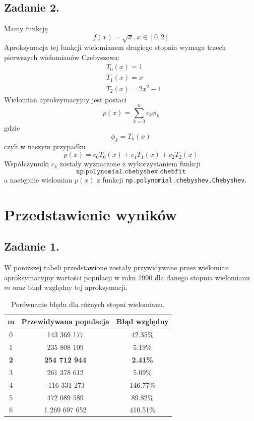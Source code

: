\documentclass[11pt]{scrartcl}
\begin{document}
    \subsection{Zadanie 2.}
    Mamy funkcję
    \[
        f(x)=\sqrt{x},x \in [0,2]
    \]
    Aproksymacja tej funkcji wielomianem drugiego stopnia
    wymaga trzech pierwszych wielomianów Czebyszewa:
    \begin{align*}
        & T_0(x) = 1 \\
        & T_1(x) = x \\
        & T_2(x) = 2x^2-1
    \end{align*}
    Wielomian aproksymacyjny jest postaci
    \[
        p(x)=\sum_{k=0}^{n}c_k\phi_k
    \]
    gdzie
    \[
        \phi_k=T_k(x)
    \]
    czyli w naszym przypadku
    \[
        p(x)=c_0T_0(x)+c_1T_1(x)+c_2T_2(x)
    \]
    Współczynniki $c_k$ zostały wyznaczone z wykorzystaniem funkcji
    \[
        \texttt{np.polynomial.chebyshev.chebfit}
    \]
    a następnie wielomian $p(x)$ z funkcji
    \texttt{np.polynomial.chebyshev.Chebyshev}.

    \section{Przedstawienie wyników}
    \subsection{Zadanie 1.}
    W poniższej tabeli przedstawione zostały przywidywane przez wielomian
    aproksymacyjny wartości populacji w roku 1990 dla danego stopnia
    wielomianu $m$ oraz błąd względny tej aproksymacji.
    
    \begin{table}[H]
        \centering
        \renewcommand{\arraystretch}{1.5}
        \begin{tabular}{|c|c|c|}
            \hline
            \textbf{m} & \textbf{Przewidywana populacja} &
            \textbf{Błąd względny} \\
            \hline
            0 & 143 369 177 & 42.35\% \\
            \hline
            1 & 235 808 109 & 5.19\% \\
            \hline
            \textbf{2} & \textbf{254 712 944} & \textbf{2.41\%} \\
            \hline
            3 & 261 378 612 & 5.09\% \\
            \hline
            4 & -116 331 273 & 146.77\% \\
            \hline
            5 & 472 089 589 & 89.82\% \\
            \hline
            6 & 1 269 697 652 & 410.51\% \\
            \hline
        \end{tabular}
        \caption{Porównanie błędu dla różnych stopni wielomianu.}
    \end{table}
\end{document}
